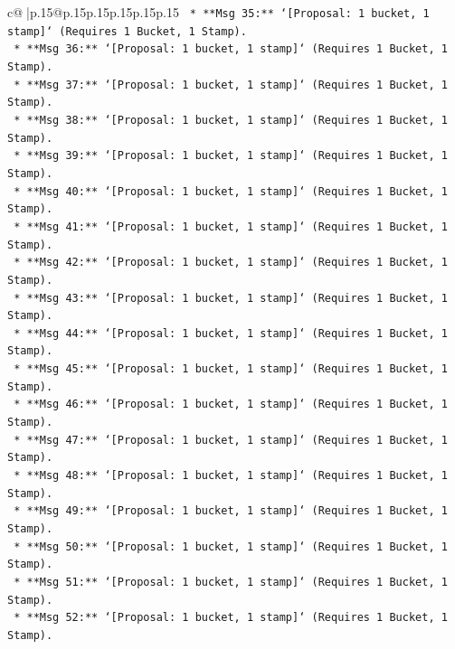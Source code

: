 \documentclass{article}
\begin{document}
{\begin{supertabular}{c@{$\;$}|p{.15\linewidth}@{}p{.15\linewidth}p{.15\linewidth}p{.15\linewidth}p{.15\linewidth}p{.15\linewidth}}
{{{\texttt{                *   **Msg 35:** `{[}Proposal: 1 bucket, 1 stamp{]}` (Requires 1 Bucket, 1 Stamp).} \\
\texttt{                *   **Msg 36:** `{[}Proposal: 1 bucket, 1 stamp{]}` (Requires 1 Bucket, 1 Stamp).} \\
\texttt{                *   **Msg 37:** `{[}Proposal: 1 bucket, 1 stamp{]}` (Requires 1 Bucket, 1 Stamp).} \\
\texttt{                *   **Msg 38:** `{[}Proposal: 1 bucket, 1 stamp{]}` (Requires 1 Bucket, 1 Stamp).} \\
\texttt{                *   **Msg 39:** `{[}Proposal: 1 bucket, 1 stamp{]}` (Requires 1 Bucket, 1 Stamp).} \\
\texttt{                *   **Msg 40:** `{[}Proposal: 1 bucket, 1 stamp{]}` (Requires 1 Bucket, 1 Stamp).} \\
\texttt{                *   **Msg 41:** `{[}Proposal: 1 bucket, 1 stamp{]}` (Requires 1 Bucket, 1 Stamp).} \\
\texttt{                *   **Msg 42:** `{[}Proposal: 1 bucket, 1 stamp{]}` (Requires 1 Bucket, 1 Stamp).} \\
\texttt{                *   **Msg 43:** `{[}Proposal: 1 bucket, 1 stamp{]}` (Requires 1 Bucket, 1 Stamp).} \\
\texttt{                *   **Msg 44:** `{[}Proposal: 1 bucket, 1 stamp{]}` (Requires 1 Bucket, 1 Stamp).} \\
\texttt{                *   **Msg 45:** `{[}Proposal: 1 bucket, 1 stamp{]}` (Requires 1 Bucket, 1 Stamp).} \\
\texttt{                *   **Msg 46:** `{[}Proposal: 1 bucket, 1 stamp{]}` (Requires 1 Bucket, 1 Stamp).} \\
\texttt{                *   **Msg 47:** `{[}Proposal: 1 bucket, 1 stamp{]}` (Requires 1 Bucket, 1 Stamp).} \\
\texttt{                *   **Msg 48:** `{[}Proposal: 1 bucket, 1 stamp{]}` (Requires 1 Bucket, 1 Stamp).} \\
\texttt{                *   **Msg 49:** `{[}Proposal: 1 bucket, 1 stamp{]}` (Requires 1 Bucket, 1 Stamp).} \\
\texttt{                *   **Msg 50:** `{[}Proposal: 1 bucket, 1 stamp{]}` (Requires 1 Bucket, 1 Stamp).} \\
\texttt{                *   **Msg 51:** `{[}Proposal: 1 bucket, 1 stamp{]}` (Requires 1 Bucket, 1 Stamp).} \\
\texttt{                *   **Msg 52:** `{[}Proposal: 1 bucket, 1 stamp{]}` (Requires 1 Bucket, 1 Stamp).} \\
}}}
\end{supertabular}}
\end{document}
